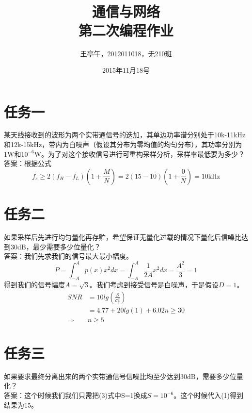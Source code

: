 \documentclass{article}
\begin{document}
\title{通信与网络\\第二次编程作业}
\author{王亭午，2012011018，无210班}
\date{2015年11月18号}
\maketitle
\section{任务一}
某天线接收到的波形为两个实带通信号的迭加，其单边功率谱分别处于10k-11kHz和12k-15kHz，带内为白噪声（假设其分布为零均值的均匀分布），其功率分别为1W和\(10^{-6}\)W。为了对这个接收信号进行可重构采样分析，采样率最低要为多少？\\
答案：根据公式
\begin{equation}
f_s \geq 2(f_H - f_L) (1 + \frac{M}{N})=2(15 - 10) (1 + \frac{0}{N}) = 10\mbox{kHz}
\end{equation}
\section{任务二}
如果采样后先进行均匀量化再存贮，希望保证无量化过载的情况下量化后信噪比达到30dB，最少需要多少位量化？ \\
答案：我们先求我们的信号最大最小幅度。
\begin{equation}
P = \int_{-A}^Ap(x)x^2dx = \int_{-A}^A\frac{1}{2A}x^2dx = \frac{A^2}{3} = 1
\end{equation}
得到我们的信号幅度\(A = \sqrt{3}\)。我们考虑到接受信号是白噪声，于是假设\(D = 1\)。
\begin{equation}
\begin{aligned}
SNR & = 10lg\left(\frac{S}{\sigma_q^2}\right)\\
	& = 4.77 + 20lg\left(1\right) + 6.02n \geq 30 \\
\Rightarrow \quad & n \geq 5
\end{aligned}
\end{equation}
\section{任务三}
如果要求最终分离出来的两个实带通信号信噪比均至少达到30dB，需要多少位量化？\\
答案：这个时候我们我们只需把(3)式中S=1换成\(S=10^{-6}\)。这个时候代入(1)得到结果为15。
\end{document}
